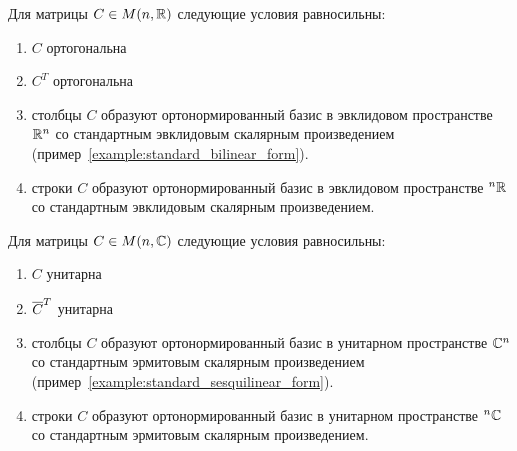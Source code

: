 \begin{lemma}\label{lem:orthogonal_equivalencies}
Для матрицы $C\in M(n,\mathbb R)$ следующие условия равносильны:
\begin{enumerate}
\item $C$ ортогональна
\item $C^T$ ортогональна
\item столбцы $C$ образуют ортонормированный базис в
  эвклидовом пространстве $\mathbb R^n$ со стандартным эвклидовым
  скалярным произведением
  (пример~\ref{example:standard_bilinear_form}).
\item строки $C$ образуют ортонормированный базис в эвклидовом
  пространстве ${}^n\mathbb R$ со стандартным эвклидовым скалярным
  произведением.
\end{enumerate}
\end{lemma}

\begin{lemma}\label{lem:unitary_equivalencies}
Для матрицы $C\in M(n,\mathbb C)$ следующие условия равносильны:
\begin{enumerate}
\item $C$ унитарна
\item $\overline{C}^T$ унитарна
\item столбцы $C$ образуют ортонормированный базис в унитарном
  пространстве $\mathbb C^n$ со стандартным эрмитовым скалярным
  произведением (пример~\ref{example:standard_sesquilinear_form}).
\item строки $C$ образуют ортонормированный базис в унитарном
  пространстве ${}^n\mathbb C$ со стандартным эрмитовым скалярным
  произведением.
\end{enumerate}
\end{lemma}

